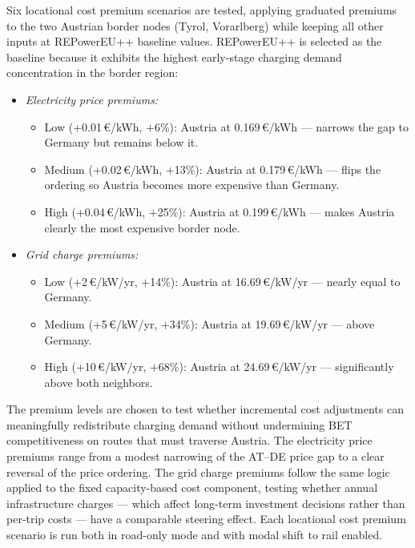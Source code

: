         Six locational cost premium scenarios are tested, applying graduated premiums to the two Austrian border nodes (Tyrol, Vorarlberg) while keeping all other inputs at REPowerEU++ baseline values. REPowerEU++ is selected as the baseline because it exhibits the highest early-stage charging demand concentration in the border region:
        \begin{itemize}
            \item \textit{Electricity price premiums:}
            \begin{itemize}
                \item Low (+0.01\,\euro/kWh, $+$6\%): Austria at 0.169\,\euro/kWh --- narrows the gap to Germany but remains below it.
                \item Medium (+0.02\,\euro/kWh, $+$13\%): Austria at 0.179\,\euro/kWh --- flips the ordering so Austria becomes more expensive than Germany.
                \item High (+0.04\,\euro/kWh, $+$25\%): Austria at 0.199\,\euro/kWh --- makes Austria clearly the most expensive border node.
            \end{itemize}
            \item \textit{Grid charge premiums:}
            \begin{itemize}
                \item Low (+2\,\euro/kW/yr, $+$14\%): Austria at 16.69\,\euro/kW/yr --- nearly equal to Germany.
                \item Medium (+5\,\euro/kW/yr, $+$34\%): Austria at 19.69\,\euro/kW/yr --- above Germany.
                \item High (+10\,\euro/kW/yr, $+$68\%): Austria at 24.69\,\euro/kW/yr --- significantly above both neighbors.
            \end{itemize}
        \end{itemize}
        The premium levels are chosen to test whether incremental cost adjustments can meaningfully redistribute charging demand without undermining \ac{BET} competitiveness on routes that must traverse Austria. The electricity price premiums range from a modest narrowing of the AT--DE price gap to a clear reversal of the price ordering. The grid charge premiums follow the same logic applied to the fixed capacity-based cost component, testing whether annual infrastructure charges --- which affect long-term investment decisions rather than per-trip costs --- have a comparable steering effect. Each locational cost premium scenario is run both in road-only mode and with modal shift to rail enabled.


